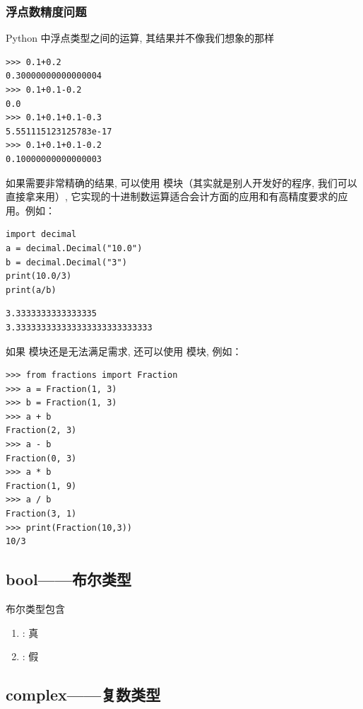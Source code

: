 \subsubsection{浮点数精度问题}
Python 中浮点类型之间的运算, 其结果并不像我们想象的那样
\begin{lstlisting}[style=demostyle,numbers=none]
>>> 0.1+0.2
0.30000000000000004
>>> 0.1+0.1-0.2
0.0
>>> 0.1+0.1+0.1-0.3
5.551115123125783e-17
>>> 0.1+0.1+0.1-0.2
0.10000000000000003
\end{lstlisting}

如果需要非常精确的结果, 可以使用  模块（其实就是别人开发好的程序, 我们可以直接拿来用）, 
它实现的十进制数运算适合会计方面的应用和有高精度要求的应用。例如：
\begin{lstlisting}[style=demostyle,numbers=none]
import decimal
a = decimal.Decimal("10.0")
b = decimal.Decimal("3")
print(10.0/3)
print(a/b)
\end{lstlisting}
\begin{lstlisting}[style=demostyle,numbers=none]
3.3333333333333335
3.333333333333333333333333333
\end{lstlisting}

如果  模块还是无法满足需求, 还可以使用  模块, 例如：
\begin{lstlisting}[style=demostyle,numbers=none]
>>> from fractions import Fraction
>>> a = Fraction(1, 3)
>>> b = Fraction(1, 3)
>>> a + b
Fraction(2, 3)
>>> a - b
Fraction(0, 3)
>>> a * b
Fraction(1, 9)
>>> a / b
Fraction(3, 1)
>>> print(Fraction(10,3))
10/3
\end{lstlisting}

\subsection{bool——布尔类型}
布尔类型包含
\begin{enumerate}[label=\arabic*)]
    \item {}: 真
    \item {}: 假
\end{enumerate}


\subsection{complex——复数类型}




